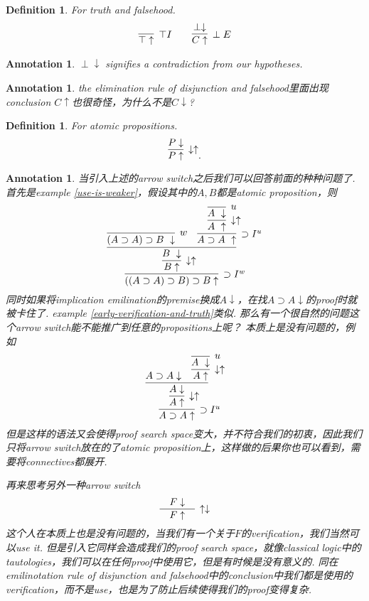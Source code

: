 \documentclass{article}
\theoremstyle{plain}
\newtheorem{definition}[theorem]{Definition}
\newtheorem{annotation}[theorem]{Annotation}
\theoremstyle{nonumberplain}
\begin{document}
\begin{definition}
\rm For truth and falsehood.
$$
\begin{aligned}
& \infer[\top I]{\top \uparrow}{} &&& \infer[\perp E]{C\uparrow}{\perp \downarrow}
\end{aligned}
$$
\end{definition}

\begin{annotation}
\rm $\perp \downarrow$ signifies a contradiction from our hypotheses.
\end{annotation}

\begin{annotation}
\rm the elimination rule of disjunction and falsehood里面出现conclusion $C \uparrow$也很奇怪，为什么不是$C \downarrow$?
\end{annotation}

\begin{definition}\label{arrow switch of atomic}
\rm For atomic propositions.
$$
\infer[\downarrow\uparrow]{P \uparrow}{P \downarrow}.
$$
\end{definition}

\begin{annotation}
\rm 当引入上述的arrow switch之后我们可以回答前面的种种问题了. 首先是example \ref{use-is-weaker}，假设其中的$A,B$都是atomic proposition，则
$$
\infer[\supset I^w]{((A \supset A) \supset B) \supset B \uparrow}{\infer[\downarrow\uparrow]{B \uparrow}{\infer{B ~\downarrow}{\infer[w]{(A\supset A) \supset B ~\downarrow}{} & \infer[\supset I^u]{A \supset A ~\uparrow}{\infer[\downarrow\uparrow]{A~\uparrow}{\infer[u]{A~\downarrow}{}}}}}}
$$
同时如果将implication emilination的premise换成$A \downarrow$，在找$A \supset A \downarrow$的proof时就被卡住了. example \ref{early-verification-and-truth}类似. 那么有一个很自然的问题这个arrow switch能不能推广到任意的propositions上呢？ 本质上是没有问题的，例如
$$
\infer[\supset I^u]{A \supset A \uparrow}{\infer[\downarrow\uparrow]{A \uparrow}{\infer{A \downarrow}{A \supset A \downarrow & \infer[\downarrow\uparrow]{A \uparrow}{\infer[u]{A~\downarrow}{}}}}}
$$
但是这样的语法又会使得proof search space变大，并不符合我们的初衷，因此我们只将arrow switch放在的了atomic proposition上，这样做的后果你也可以看到，需要将connectives都展开.  

再来思考另外一种arrow switch
$$
\infer[\uparrow\downarrow]{F \uparrow}{&F \downarrow&}
$$
这个人在本质上也是没有问题的，当我们有一个关于$F$的verification，我们当然可以use it. 但是引入它同样会造成我们的proof search space，就像classical logic中的tautologies，我们可以在任何proof中使用它，但是有时候是没有意义的. 同在emilinotation rule of disjunction and falsehood中的conclusion中我们都是使用的verification，而不是use，也是为了防止后续使得我们的proof变得复杂. 
\end{annotation}
\end{document}
